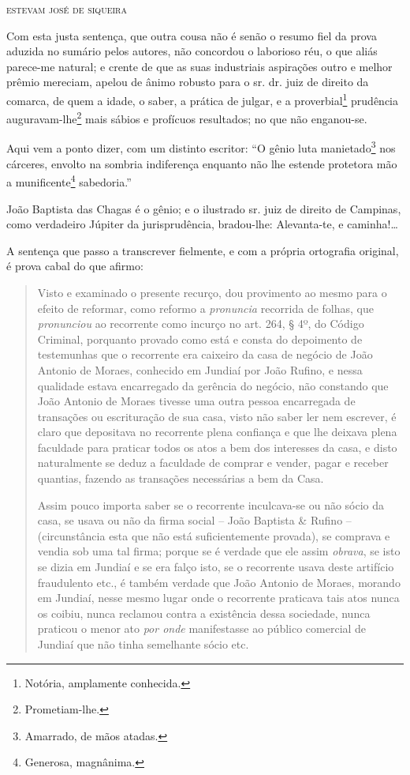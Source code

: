 {\begin{flushright}
\textsc{estevam josé de siqueira}
\end{flushright}

\asterisc{}

Com esta justa sentença, que outra cousa não é senão o resumo fiel da
prova aduzida no sumário pelos autores, não concordou o laborioso réu, o
que aliás parece-me natural; e crente de que as suas industriais
aspirações outro e melhor prêmio mereciam, apelou de ânimo robusto para
o sr. dr. juiz de direito da comarca, de quem a idade, o saber, a
prática de julgar, e a proverbial\footnote{ Notória, amplamente
  conhecida.} prudência auguravam-lhe\footnote{ Prometiam-lhe.} mais
sábios e profícuos resultados; no que não enganou-se.

Aqui vem a ponto dizer, com um distinto escritor: ``O gênio luta
manietado\footnote{ Amarrado, de mãos atadas.} nos cárceres, envolto na
sombria indiferença enquanto não lhe estende protetora mão a
munificente\footnote{ Generosa, magnânima.} sabedoria.''

João Baptista das Chagas é o gênio; e o ilustrado sr. juiz de direito de
Campinas, como verdadeiro Júpiter da jurisprudência, bradou-lhe:
Alevanta-te, e caminha!\ldots{}

A sentença que passo a transcrever fielmente, e com a própria ortografia
original, é prova cabal do que afirmo:

\begin{quote}
Visto e examinado o presente recurço, dou provimento ao mesmo para o
efeito de reformar, como reformo a \emph{pronuncia} recorrida de folhas,
que \emph{pronunciou} ao recorrente como incurço no art. 264, § 4º, do
Código Criminal, porquanto provado como está e consta do depoimento de
testemunhas que o recorrente era caixeiro da casa de negócio de João
Antonio de Moraes, conhecido em Jundiaí por João Rufino, e nessa
qualidade estava encarregado da gerência do negócio, não constando que
João Antonio de Moraes tivesse uma outra pessoa encarregada de
transações ou escrituração de sua casa, visto não saber ler nem
escrever, é claro que depositava no recorrente plena confiança e que lhe
deixava plena faculdade para praticar todos os atos a bem dos interesses
da casa, e disto naturalmente se deduz a faculdade de comprar e vender,
pagar e receber quantias, fazendo as transações necessárias a bem da
Casa.

Assim pouco importa saber se o recorrente inculcava-se ou não sócio da
casa, se usava ou não da firma social -- João Baptista \& Rufino --
(circunstância esta que não está suficientemente provada), se comprava e
vendia sob uma tal firma; porque se é verdade que ele assim
\emph{obrava}, se isto se dizia em Jundiaí e se era falço isto, se o
recorrente usava deste artifício fraudulento etc., é também verdade que
João Antonio de Moraes, morando em Jundiaí, nesse mesmo lugar onde o
recorrente praticava tais atos nunca os coibiu, nunca reclamou contra a
existência dessa sociedade, nunca praticou o menor ato \emph{por onde}
manifestasse ao público comercial de Jundiaí que não tinha semelhante
sócio etc.


\end{quote}}
